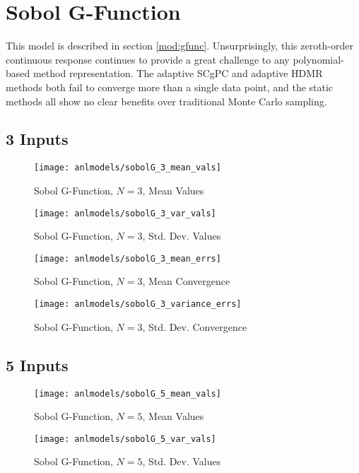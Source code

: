 \section{Sobol G-Function}
This model is described in section \ref{mod:gfunc}.
Unsurprisingly, this zeroth-order continuous response continues to provide a great challenge to any
polynomial-based method representation.  The adaptive SCgPC and adaptive HDMR methods both fail to converge
more than a single data point, and the static methods all show no clear benefits over traditional Monte Carlo
sampling.
\subsection{3 Inputs}
\begin{figure}[H]
  \centering
  \texttt{[image: anlmodels/sobolG\_3\_mean\_vals]}
  \caption{Sobol G-Function, $N=3$, Mean Values}
  \label{fig:sobolG mean values 3}
\end{figure}
\begin{figure}[H]
  \centering
  \texttt{[image: anlmodels/sobolG\_3\_var\_vals]}
  \caption{Sobol G-Function, $N=3$, Std. Dev. Values}
  \label{fig:sobolG var values 3}
\end{figure}

\begin{figure}[H]
  \centering
  \texttt{[image: anlmodels/sobolG\_3\_mean\_errs]}
  \caption{Sobol G-Function, $N=3$, Mean Convergence}
  \label{fig:sobolG mean errors 3}
\end{figure}
\begin{figure}[H]
  \centering
  \texttt{[image: anlmodels/sobolG\_3\_variance\_errs]}
  \caption{Sobol G-Function, $N=3$, Std. Dev. Convergence}
  \label{fig:sobolG var errors 3}
\end{figure}

\subsection{5 Inputs}
\begin{figure}[H]
  \centering
  \texttt{[image: anlmodels/sobolG\_5\_mean\_vals]}
  \caption{Sobol G-Function, $N=5$, Mean Values}
  \label{fig:sobolG mean values 5}
\end{figure}
\begin{figure}[H]
  \centering
  \texttt{[image: anlmodels/sobolG\_5\_var\_vals]}
  \caption{Sobol G-Function, $N=5$, Std. Dev. Values}
  \label{fig:sobolG var values 5}
\end{figure}


